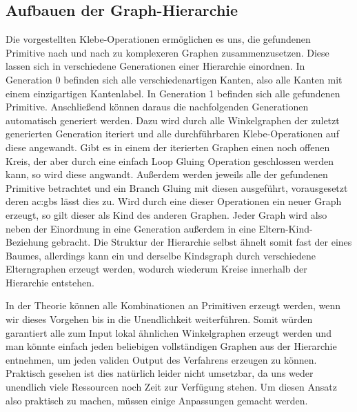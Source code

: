 \subsection{Aufbauen der Graph-Hierarchie}
Die vorgestellten Klebe-Operationen ermöglichen es uns, die gefundenen Primitive nach und nach zu komplexeren Graphen zusammenzusetzen.
Diese lassen sich in verschiedene Generationen einer Hierarchie einordnen. In Generation 0 befinden sich alle verschiedenartigen
Kanten, also alle Kanten mit einem einzigartigen Kantenlabel. In Generation 1 befinden sich alle gefundenen Primitive. Anschließend können daraus
die nachfolgenden Generationen automatisch generiert werden. Dazu wird durch alle Winkelgraphen der zuletzt generierten Generation iteriert
und alle durchführbaren Klebe-Operationen auf diese angewandt. Gibt es in einem der iterierten Graphen einen noch offenen Kreis, der aber
durch eine einfach Loop Gluing Operation geschlossen werden kann, so wird diese angwandt. Außerdem werden jeweils alle der gefundenen Primitive
betrachtet und ein Branch Gluing mit diesen ausgeführt, vorausgesetzt deren \gls{ac:gbs} lässt dies zu.
Wird durch eine dieser Operationen ein neuer Graph erzeugt, so gilt dieser als Kind des anderen Graphen. Jeder Graph wird
also neben der Einordnung in eine Generation außerdem in eine Eltern-Kind-Beziehung gebracht. Die Struktur der Hierarchie selbst ähnelt somit
fast der eines Baumes, allerdings kann ein und derselbe Kindsgraph durch verschiedene Elterngraphen erzeugt werden, wodurch wiederum Kreise
innerhalb der Hierarchie entstehen.

In der Theorie können alle Kombinationen an Primitiven erzeugt werden, wenn wir dieses Vorgehen bis in die Unendlichkeit weiterführen. Somit
würden garantiert alle zum Input lokal ähnlichen Winkelgraphen erzeugt werden und man könnte einfach jeden beliebigen vollständigen Graphen
aus der Hierarchie entnehmen, um jeden validen Output des Verfahrens erzeugen zu können. Praktisch gesehen ist dies natürlich leider nicht
umsetzbar, da uns weder unendlich viele Ressourcen noch Zeit zur Verfügung stehen. Um diesen Ansatz also praktisch zu machen, müssen einige
Anpassungen gemacht werden.

